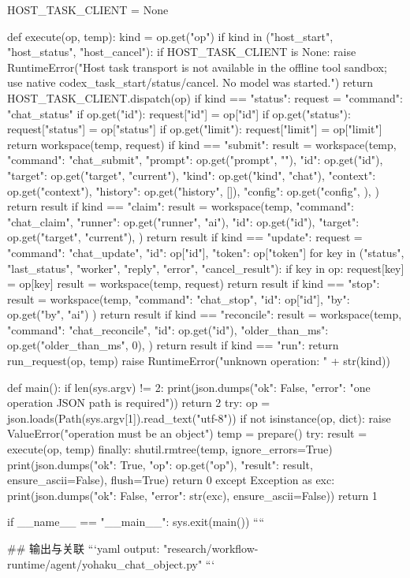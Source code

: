 HOST_TASK_CLIENT = None


def execute(op, temp):
    kind = op.get("op")
    if kind in ("host_start", "host_status", "host_cancel"):
        if HOST_TASK_CLIENT is None:
            raise RuntimeError("Host task transport is not available in the offline tool sandbox; use native codex_task_start/status/cancel. No model was started.")
        return HOST_TASK_CLIENT.dispatch(op)
    if kind == "status":
        request = {"command": "chat_status"}
        if op.get("id"):
            request["id"] = op["id"]
        if op.get("status"):
            request["status"] = op["status"]
        if op.get("limit"):
            request["limit"] = op["limit"]
        return workspace(temp, request)
    if kind == "submit":
        result = workspace(temp, {
            "command": "chat_submit",
            "prompt": op.get("prompt", ""),
            "id": op.get("id"),
            "target": op.get("target", "current"),
            "kind": op.get("kind", "chat"),
            "context": op.get("context"),
            "history": op.get("history", []),
            "config": op.get("config", {}),
        })
        return result
    if kind == "claim":
        result = workspace(temp, {
            "command": "chat_claim",
            "runner": op.get("runner", "ai"),
            "id": op.get("id"),
            "target": op.get("target", "current"),
        })
        return result
    if kind == "update":
        request = {"command": "chat_update", "id": op["id"], "token": op["token"]}
        for key in ("status", "last_status", "worker", "reply", "error", "cancel_result"):
            if key in op:
                request[key] = op[key]
        result = workspace(temp, request)
        return result
    if kind == "stop":
        result = workspace(temp, {
            "command": "chat_stop", "id": op["id"], "by": op.get("by", "ai")
        })
        return result
    if kind == "reconcile":
        result = workspace(temp, {
            "command": "chat_reconcile",
            "id": op.get("id"),
            "older_than_ms": op.get("older_than_ms", 0),
        })
        return result
    if kind == "run":
        return run_request(op, temp)
    raise RuntimeError("unknown operation: " + str(kind))


def main():
    if len(sys.argv) != 2:
        print(json.dumps({"ok": False, "error": "one operation JSON path is required"}))
        return 2
    try:
        op = json.loads(Path(sys.argv[1]).read_text("utf-8"))
        if not isinstance(op, dict):
            raise ValueError("operation must be an object")
        temp = prepare()
        try:
            result = execute(op, temp)
        finally:
            shutil.rmtree(temp, ignore_errors=True)
        print(json.dumps({"ok": True, "op": op.get("op"), "result": result},
                         ensure_ascii=False), flush=True)
        return 0
    except Exception as exc:
        print(json.dumps({"ok": False, "error": str(exc)}, ensure_ascii=False))
        return 1


if __name__ == "__main__":
    sys.exit(main())
````

## 输出与关联
```yaml
output: "research/workflow-runtime/agent/yohaku_chat_object.py"
```
